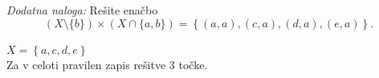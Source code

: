 \documentclass[addpoints,12pt]{exam}
\begin{document}
\begin{questions}
    
    \bonusquestion[3]
    \textit{Dodatna naloga:} Rešite enačbo $$(X\setminus\{b\})\times(X \cap \{a,b\})=\left\{(a,a),(c,a),(d,a),(e,a)\right\}.$$

    \begin{solution}
        $X=\left\{a,c,d,e\right\}$ \\
        Za v celoti pravilen zapis rešitve $3$ točke.
    \end{solution}

\end{questions}
\end{document}

